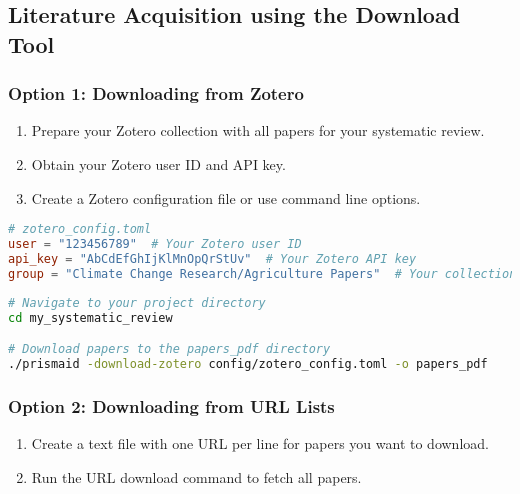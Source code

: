 \subsection{Literature Acquisition using the Download Tool}

\subsubsection{Option 1: Downloading from Zotero}
\begin{enumerate}
    \item Prepare your Zotero collection with all papers for your systematic review.
    \item Obtain your Zotero user ID and API key.
    \item Create a Zotero configuration file or use command line options.
\end{enumerate}

\begin{configbox}
\begin{lstlisting}[language=TOML]
# zotero_config.toml
user = "123456789"  # Your Zotero user ID
api_key = "AbCdEfGhIjKlMnOpQrStUv"  # Your Zotero API key
group = "Climate Change Research/Agriculture Papers"  # Your collection path
\end{lstlisting}
\end{configbox}

\begin{commandbox}
\begin{lstlisting}[language=Bash]
# Navigate to your project directory
cd my_systematic_review

# Download papers to the papers_pdf directory
./prismaid -download-zotero config/zotero_config.toml -o papers_pdf
\end{lstlisting}
\end{commandbox}

\subsubsection{Option 2: Downloading from URL Lists}
\begin{enumerate}
    \item Create a text file with one URL per line for papers you want to download.
    \item Run the URL download command to fetch all papers.
\end{enumerate}

